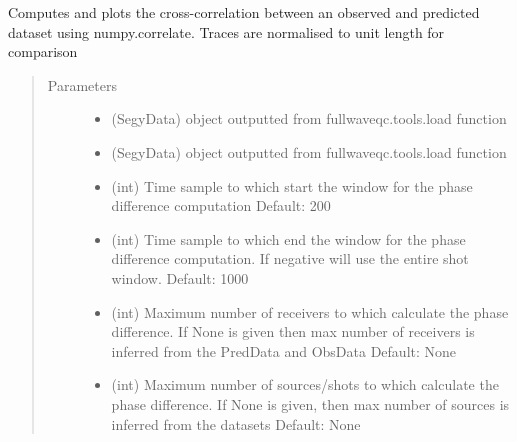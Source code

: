 \documentclass[letterpaper,10pt,english]{sphinxmanual}
\begin{document}

\begin{fulllineitems}
\label{\detokenize{index:fullwaveqc.siganalysis.xcorr}}
Computes and plots the cross-correlation between an observed and predicted dataset using numpy.correlate.
Traces are normalised to unit length for comparison
\begin{quote}\begin{description}
\item[{Parameters}] \leavevmode\begin{itemize}
\item {} 
 \textendash{} (SegyData) object outputted from fullwaveqc.tools.load function

\item {} 
 \textendash{} (SegyData) object outputted from fullwaveqc.tools.load function

\item {} 
 \textendash{} (int)      Time sample to which start the window for the phase difference computation
Default: 200

\item {} 
 \textendash{} (int)      Time sample to which end the window for the phase difference computation.
If negative will use the entire shot window.
Default: 1000

\item {} 
 \textendash{} (int)      Maximum number of receivers to which calculate the phase difference. If None is given
then max number of receivers is inferred from the PredData and ObsData
Default: None

\item {} 
 \textendash{} (int)      Maximum number of sources/shots to which calculate the phase difference. If None is
given, then max number of sources is inferred from the datasets
Default: None


\end{itemize}
\end{description}
\end{quote}
\end{fulllineitems}
\end{document}
